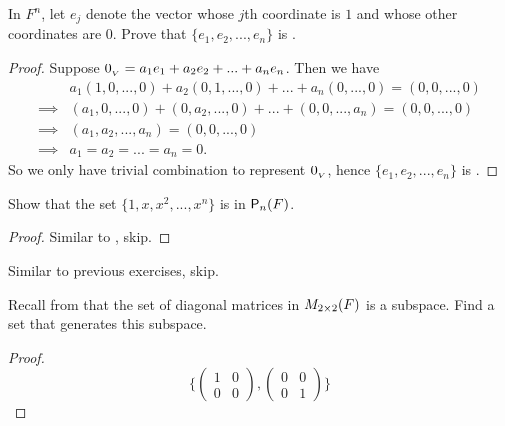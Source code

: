\begin{exercise} \label{exercise 1.5.4}
In \(F^n\), let \(e_j\) denote the vector whose \(j\)th coordinate is \(1\) and whose other coordinates are \(0\).
Prove that \( \{ e_1, e_2, ..., e_n \} \) is \LID{}.
\end{exercise}

\begin{proof}
Suppose \(0_{_V} = a_1 e_1 + a_2 e_2 + ... + a_n e_n\).
Then we have
\begin{align*}
             & a_1 (1, 0, ..., 0) + a_2 (0, 1, ..., 0) + ... + a_n(0, ..., 0) = (0, 0, ..., 0) \\
    \implies & (a_1, 0, ..., 0) + (0, a_2, ..., 0) + ... + (0, 0, ..., a_n) = (0, 0, ..., 0) \\
    \implies & (a_1, a_2, ..., a_n) = (0, 0, ..., 0) \\
    \implies & a_1 = a_2 = ... = a_n = 0.
\end{align*}
So we only have trivial combination to represent \(0_{_V}\), hence \( \{ e_1, e_2, ..., e_n \} \) is \LID{}.
\end{proof}

\begin{exercise} \label{exercise 1.5.5}
Show that the set \(\{ 1, x, x^2, ..., x^n \}\) is \LID{} in \(\textsf{P}_n(F)\).
\end{exercise}

\begin{proof}
Similar to , skip.
\end{proof}

\begin{exercise} \label{exercise 1.5.6}
Similar to previous exercises, skip.
\end{exercise}

\begin{exercise} \label{exercise 1.5.7}
Recall from  that the set of diagonal matrices in \(M_{2 \times 2}(F)\) is a subspace.
Find a \LID{} set that generates this subspace.
\end{exercise}

\begin{proof}
\[
\bigg\{
    \begin{pmatrix}
        1 & 0 \\
        0 & 0
    \end{pmatrix},
    \begin{pmatrix}
        0 & 0 \\
        0 & 1
    \end{pmatrix}
\bigg\}
\]
\end{proof}

